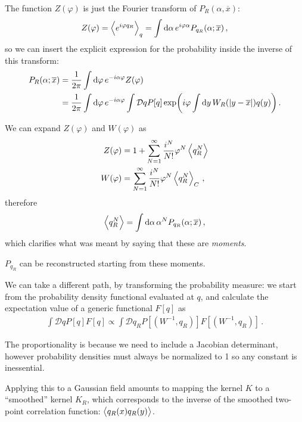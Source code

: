 \documentclass[main.tex]{subfiles}
\begin{document}
The function \(Z(\varphi )\) is just the Fourier transform of \(P_R(\alpha , \overline{x})\): 
%
\begin{align}
Z(\varphi ) = \expval{e^{i \varphi q_R}}_q 
= \int  \dd{\alpha } e^{i \varphi \alpha } P_{q_R} (\alpha ; \overline{x}) 
\,,
\end{align}
%
so we can insert the explicit expression for the probability inside the inverse of this transform: 
%
\begin{align}
P_R(\alpha ; \overline{x}) &= \frac{1}{2 \pi } \int \dd{\varphi } e^{-i \alpha \varphi } Z(\varphi ) \\
&= \frac{1}{2 \pi } \int \dd{\varphi } e^{-i \alpha \varphi }
\int \mathcal{D}q P[q] \exp(i \varphi \int \dd{y} W_R (\abs{y - \overline{x}}) q(y) )
\,.
\end{align}

We can expand \(Z(\varphi )\) and \(W(\varphi )\) as 
%
\begin{align}
Z(\varphi ) &= 1 + \sum _{N=1}^{\infty } \frac{i^{N}}{N!} \varphi^{N} \expval{q_R^{N}} \\ 
W(\varphi ) &=  \sum _{N=1}^{\infty } \frac{i^{N}}{N!} \varphi^{N} \expval{q_R^{N}}_C  
\,,
\end{align}
%
therefore 
%
\begin{align}
\expval{q_R^{N}} = \int \dd{\alpha } \alpha^{N} P_{q_R} (\alpha ; \overline{x})
\,,
\end{align}
%
which clarifies what was meant by saying that these are \emph{moments}. 

\(P_{q_R}\) can be reconstructed starting from these moments. 

We can take a different path, by transforming the probability measure: we start from the probability density functional evaluated at \(q\), and calculate the expectation value of a generic functional \(F[q]\) as 
%
\begin{align}
\int \mathcal{D}q P[q] F[q]
\propto \int \mathcal{D}q_R P[(W^{-1}, q_R)] F[(W^{-1}, q_R)]
\,.
\end{align}

The proportionality is because we need to include a Jacobian determinant, however probability densities must always be normalized to 1 so any constant is inessential. 

Applying this to a Gaussian field amounts to mapping the kernel \(K\) to a ``smoothed'' kernel \(K_R\), which corresponds to the inverse of the smoothed two-point correlation function: \(\expval{q_R(x) q_R(y)}\). 
\end{document}
